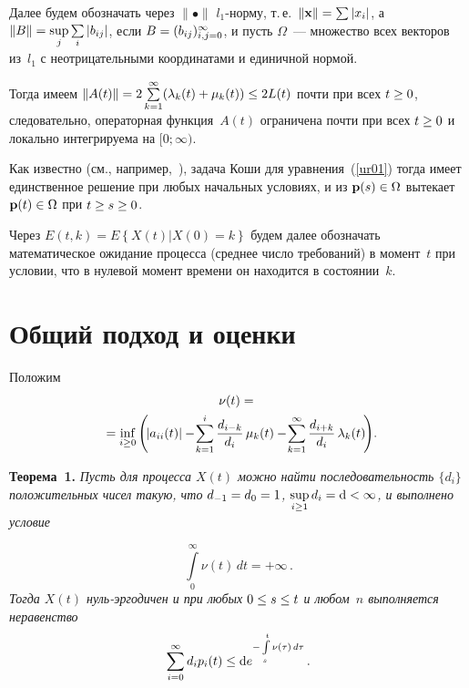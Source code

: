 \begin{multicols}{2}
Далее будем обозначать через $\|\bullet\|$  $l_1$-нор\-му, т.\,е.\ 
$\|{\vx}\|\hm=\sum|x_i|$, а $\|B\| \hm= \sup\limits_j \sum\limits_i |b_{ij}|$, 
если $B \hm= (b_{ij})_{i,j=0}^{\infty}$, и пусть $\Omega$~--- множество всех векторов из~$l_1$ 
с неотрицательными координатами и единичной нормой.

Тогда имеем $\|A(t)\| \hm= 2\sum\limits_{k=1}^{\infty}(\la_{k}(t)\hm+ \mu_k(t)) \hm\le 2 L(t)$ 
почти при всех $t\hm \ge 0$, следовательно, операторная функция~$A(t)$ ограничена почти при 
всех $t \hm\ge 0$ и локально интегрируема на $[0;\infty)$.

Как известно (см., например,~\cite{DK}), задача Коши для уравнения~(\ref{ur01}) 
тогда имеет единственное решение при любых начальных
условиях, и из $\vp(s) \hm\in \Omega$ вытекает  $\vp(t)\hm \in \Omega$ при
$t \hm\ge s \hm\ge 0$.

Через $E(t,k) = E\left\{X(t)\left|X(0)=k\right.\right\}$ будем далее
обозначать математическое  ожидание процесса (среднее число
требований) в момент~$t$ при условии, что в нулевой момент времени
он находится в состоянии~$k$.

\section{Общий подход и оценки}

Положим
\begin{multline}
\nu(t) ={}\\
\hspace*{-1mm}{}= \inf\limits_{i \ge 0} 
\left(\! |a_{ii}(t)| -\!
\sum\limits_{k=1}^{i}\fr{d_{i-k}}{d_i}\,\mu_k(t) -\! 
\sum\limits_{k=1}^{\infty} \fr{d_{i+k}}{d_i}\,\la_{k}(t)
 \!\right)\!.\hspace*{-2mm}
\label{2001}
\end{multline}

\smallskip


\noindent
\textbf{Теорема~1.}
\textit{Пусть для процесса $X\left( t\right) $ можно найти последовательность $\{d_i\}$
положительных чисел такую, что  $d_{-1}\hm=d_{0}\hm=1$, $\sup\limits_{i \ge
1} d_i \hm= {\rm d}\hm<\infty$, и выполнено условие}

\noindent
\begin{equation*}
 \int\limits_{0}^{\infty} \nu(t) \, dt = + \infty\,.
\end{equation*}
\textit{Тогда  $X\left( t\right) $ нуль-эр\-го\-ди\-чен и при любых $0 \hm\le s \hm\le t$ 
и любом~$n$ выполняется неравенство}
\begin{equation*}
\sum_{i=0}^{\infty} d_i p_i (t) \le
 {\rm d} e^{-\int\limits_s^t \nu(\tau) \, d\tau} \,.  
\end{equation*}



\end{multicols}

